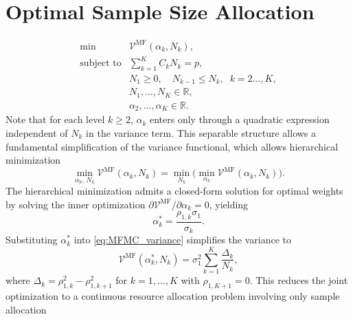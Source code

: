 \section{Optimal Sample Size Allocation}\label{sec:MFMC_Nk_optimize}




\begin{equation}\label{eq:Optimization_pb_sample_size}
    \begin{array}{ll}
    \min &\mathcal{V}^{\text{MF}}\left(\alpha_k,N_k\right),\\
       \text{subject to} &\displaystyle\sum\limits_{k=1}^K C_kN_k=p,\\[2pt]
       &\displaystyle N_1\ge 0,\quad \displaystyle N_{k-1}\le N_k, \;\; k=2\ldots,K,\\
       &N_1,\ldots, N_K\in \mathbb{R},\\
       &\alpha_2,\ldots,\alpha_K\in \mathbb{R}.
    \end{array}
\end{equation}
%
Note that for each level $k\ge 2$, $\alpha_k$ enters only through a quadratic expression independent of $N_k$ in the variance term. This separable structure allows a fundamental simplification of the variance functional, which allows hierarchical minimization
%
\begin{equation*}
    \min_{\alpha_k,\, N_k} \mathcal{V}^{\text{MF}}\left(\alpha_k, N_k\right)
    = \min_{N_k}\Big(\min_{\alpha_k} \mathcal{V}^{\text{MF}}(\alpha_k, N_k)\Big).
\end{equation*}
%
The hierarchical minimization admits a closed-form solution for optimal weights by solving the inner optimization $\partial \mathcal{V}^{\text{MF}}/\partial \alpha_k = 0$, yielding 
%
\begin{equation}\label{eq:MFMC_weights}
    \alpha_k^* = \frac{\rho_{1,k}\sigma_1}{\sigma_k}.
\end{equation}
%
Substituting $\alpha_k^*$ into \eqref{eq:MFMC_variance} simplifies the variance to 
%
\begin{equation*}
    \mathcal{V}^{\text{MF}}\left(\alpha_k^*, N_k\right)
    = \sigma_1^2\sum_{k=1}^K \frac{\Delta_k}{N_k},
\end{equation*}
%
where $\Delta_k = \rho_{1,k}^2 - \rho_{1,k+1}^2$ for $k = 1, \dots, K$ with $\rho_{1,K+1}=0$. This reduces the joint optimization to a continuous resource allocation problem involving only sample allocation

